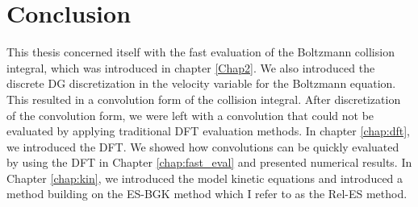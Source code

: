 \documentclass[12pt]{CSUNthesis}
\begin{document}
\chapter{Conclusion}
This thesis concerned itself with the fast evaluation of the Boltzmann collision integral, which was introduced in chapter \ref{Chap2}. We also introduced the discrete DG discretization in the velocity variable for the Boltzmann equation. This resulted in a convolution form of the collision integral. After discretization of the convolution form, we were left with a convolution that could not be evaluated by applying traditional DFT evaluation methods. In chapter \ref{chap:dft}, we introduced the DFT. We showed how convolutions can be quickly evaluated by using the DFT in Chapter \ref{chap:fast_eval} and presented numerical results. In Chapter \ref{chap:kin}, we introduced the model kinetic equations and introduced a method building on the ES-BGK method which I refer to as the Rel-ES method.



\clearpage
{}


\end{document}

